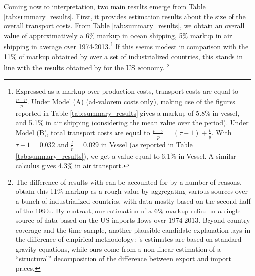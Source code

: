 \documentclass[a4paper,11pt]{article}
\begin{document}
Coming now to interpretation, two main results emerge from Table \ref{tab:summary_results}. First, it provides estimation results about the size of the overall transport costs. From Table \ref{tab:summary_results}, we obtain an overall value of approximatively a 6\% markup in ocean shipping, 5\% markup in air shipping in average over 1974-2013.\footnote{Expressed as a markup over production costs, transport costs are equal to $\frac{p-\widetilde{p}}{\widetilde{p}}$. Under Model (A) (ad-valorem costs only), making use of the figures reported in Table \ref{tab:summary_results} gives a markup of 5.8\% in vessel, and 5.1\% in air shipping (considering the mean value over the period). Under Model (B), total transport costs are equal to $\frac{p-\widetilde{p}}{\widetilde{p}} = (\tau-1) + \frac{t}{\widetilde{p}}$. With $\tau-1= 0.032$ and $\frac{t}{\widetilde{p}}= 0.029$ in Vessel (as reported in Table \ref{tab:summary_results}), we get a value equal to 6.1\% in Vessel. A similar calculus gives 4.3\% in air transport.} If this seems modest in comparison with the 11\% of markup obtained by \citet{anderson_wincoop_jel} over a set of industrialized countries, this stands in line with the results obtained by \citet{hummels2007} for the US economy. \footnote{The difference of results with \citet{anderson_wincoop_jel} can be accounted for by a number of reasons. \citet{anderson_wincoop_jel} obtain this 11\% markup as a rough value by aggregating various sources over a bunch of industrialized countries, with data mostly based on the second half of the 1990s. By contrast, our estimation of a 6\% markup relies on a single source of data based on the US imports flows over 1974-2013. Beyond country coverage and the time sample, another plausible candidate explanation lays in the difference of empirical methodology: \citet{anderson_wincoop_jel}'s estimates are based on standard gravity equations, while ours come from a non-linear estimation of a ``structural'' decomposition of the difference between export and import prices.}
\end{document}
